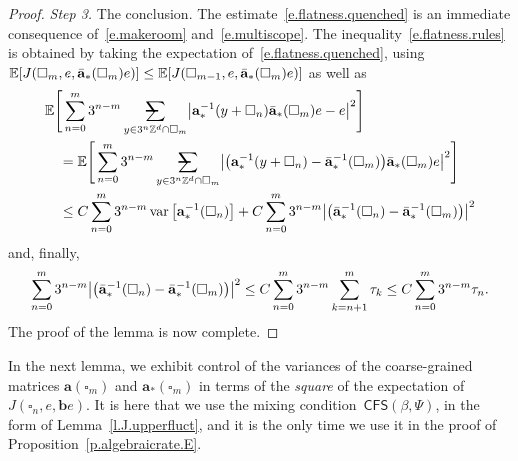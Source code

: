 \documentclass[11pt]{article} %
\makeatletter
\let\oldsquare\square %
\renewcommand{\square}{\oldsquare}
\numberwithin{equation}{section}
\theoremstyle{definition}
\let\originalleft\left
\let\originalright\right
\renewcommand{\left}{\mathopen{}\mathclose\bgroup\originalleft}
\renewcommand{\right}{\aftergroup\egroup\originalright}
\newcommand*{\Zd}{\ensuremath{\mathbb{Z}^d}}
\renewcommand{\b}{\ensuremath{\mathbf{b}}}
\renewcommand{\a}{\mathbf{a}}
\newcommand{\ahom}{\bar{\a}}
\newcommand{\cu}{\square}
\newcommand{\E}{\mathbb{E}}
\DeclareMathOperator{\var}{var}
\newcommand{\avsum}{\mathop{\mathpalette\avsuminner\relax}\displaylimits}
\newcommand\avsuminner[2]{%
  {\sbox0{$\m@th#1\sum$}%
   \vphantom{\usebox0}%
   \ooalign{%
     \hidewidth
     \smash{\,\rule[.23em]{8.8pt}{1.1pt} \relax}%
     \hidewidth\cr
     $\m@th#1\sum$\cr
   }%
  }%
}
\newcommand{\CFS}{\mathsf{CFS}}
\makeatother
\begin{document}
\begin{proof}
\smallskip

\emph{Step 3.} The conclusion. The estimate~\eqref{e.flatness.quenched}
is an immediate consequence of~\eqref{e.makeroom} and~\eqref{e.multiscope}.
The inequality~\eqref{e.flatness.rules} is obtained by taking the expectation of~\eqref{e.flatness.quenched}, using 
$\E \left[ J(\cu_m,e,\ahom_*(\cu_m)e) \right] \leq \E \left[ J(\cu_{m-1},e,\ahom_*(\cu_m)e) \right]$ as well as 
\begin{align*}
\lefteqn{
\E \Bigg[
\sum_{n=0}^{{m}} 3^{n-m} 
\avsum_{y\in 3^n\Zd\cap \cu_{m}} 
\left| \a_*^{-1}(y+\cu_n) \ahom_*(\cu_m)e - e\right|^2
\Bigg]
} \quad & 
\notag \\ & 
=
\E \Bigg[
\sum_{n=0}^{{m}} 3^{n-m} 
\avsum_{y\in 3^n\Zd\cap \cu_{m}} 
\left| \bigl(
\a_*^{-1}(y+\cu_n) - \ahom_*^{-1} (\cu_m) \bigr) \ahom_*(\cu_m) e
\right|^2
\Bigg]
\\ & 
\leq 
C
\sum_{n=0}^{{m}} 3^{n-m} 
\var\big[ \a_*^{-1}(\cu_n) \big]
+
C
\sum_{n=0}^{{m}} 3^{n-m} 
\left| \bigl(
\ahom_*^{-1}(\cu_n) - \ahom_*^{-1} (\cu_m) \bigr) 
\right|^2
\end{align*}
and, finally, 
\begin{equation*}
\sum_{n=0}^{{m}} 3^{n-m} 
\left| \bigl(
\ahom_*^{-1}(\cu_n) - \ahom_*^{-1} (\cu_m) \bigr) 
\right|^2
\leq 
C\sum_{n=0}^{{m}} 
3^{n-m} \sum_{k=n+1}^m \tau_k
\leq 
C\sum_{n=0}^{{m}} 
3^{n-m} \tau_n.
\end{equation*}
The proof of the lemma is now complete.
\end{proof}

In the next lemma, we exhibit control of the variances of the coarse-grained matrices $\a(\cu_m)$ and $\a_*(\cu_m)$ in terms of the \emph{square} of the expectation of $J(\cu_n,e,\b e)$.
It is here that we use the mixing condition~$\CFS(\beta,\Psi)$, in the form of Lemma~\ref{l.J.upperfluct}, and it is the only time we use it in the proof of Proposition~\ref{p.algebraicrate.E}. 
\end{document}
